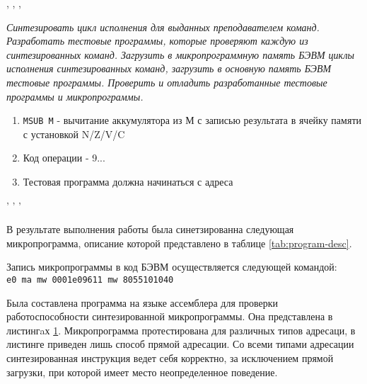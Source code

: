 \tableofcontents


\newpage
\Chapter{\lab\ \labnumber}{\labtheme}{}

\begin{center}
, , ,
\end{center}
\noindent

\textit{Синтезировать цикл исполнения для выданных преподавателем команд. Разработать тестовые программы, которые проверяют каждую из синтезированных команд. Загрузить в микропрограммную память БЭВМ циклы исполнения синтезированных команд, загрузить в основную память БЭВМ тестовые программы. Проверить и отладить разработанные тестовые программы и микропрограммы.}
\begin{enumerate}
    \item \verb|MSUB M| - вычитание аккумулятора из М с записью результата в ячейку памяти с установкой N/Z/V/C
    \item Код операции - 9...
    \item Тестовая программа должна начинаться с адреса 
\end{enumerate}
\begin{center}
    ' ' '
\end{center}

\newpage

В результате выполнения работы была синетзированна следующая микропрограмма, описание которой представлено в таблице \ref{tab:program-desc}.

Запись микропрограммы в код БЭВМ осуществляется следующей командой:\\
\verb|e0 ma mw 0001e09611 mw 8055101040|

Была составлена программа на языке ассемблера для проверки работоспособности синтезированной микропрограммы. Она представлена в листингaх  \ref{lst:script}. Микропрограмма протестирована для различных типов адресаци, в листинге приведен лишь способ прямой адресации. Со всеми типами адресации синтезированная инструкция ведет себя корректно, за исключением прямой загрузки, при которой имеет место неопределенное поведение.

\begin{figure}[h] %
    \begin{center}
        
    \end{center}
    \label{lst:script}  
\end{figure}



